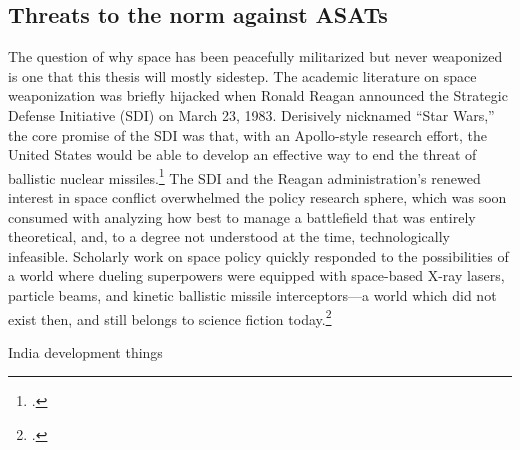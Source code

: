 \documentclass[11pt]{memoir}
\begin{document}
\subsection{Threats to the norm against ASATs}
The question of why space has been peacefully militarized but never weaponized is one that this thesis will mostly sidestep. The academic literature on space weaponization was briefly hijacked when Ronald Reagan announced the Strategic Defense Initiative (SDI) on March 23, 1983. Derisively nicknamed ``Star Wars,'' the core promise of the SDI was that, with an Apollo-style research effort, the United States would be able to develop an effective way to end the threat of ballistic nuclear missiles.\footcite{reagan_address_1983} The SDI and the Reagan administration's renewed interest in space conflict overwhelmed the policy research sphere, which was soon consumed with analyzing how best to manage a battlefield that was entirely theoretical, and, to a degree not understood at the time, technologically infeasible. Scholarly work on space policy quickly responded to the possibilities of a world where dueling superpowers were equipped with space-based X-ray lasers, particle beams, and kinetic ballistic missile interceptors---a world which did not exist then, and still belongs to science fiction today.\footcite[p.~1-2]{mowthorpe_militarization_2004}


India development things


\end{document}
